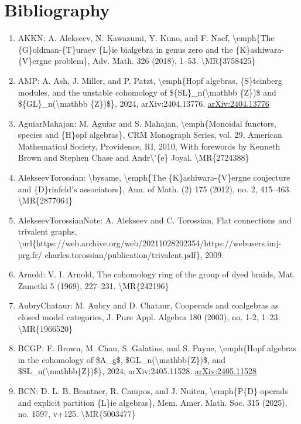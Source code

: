 \documentclass[11pt]{article}
\begin{document}
\section*{Bibliography}
\begin{enumerate}[leftmargin=*]
  \item AKKN: A. Alekseev, N. Kawazumi, Y. Kuno, and F. Naef, \textbackslash{}emph\{The \{G\}oldman-\{T\}uraev \{L\}ie bialgebra in genus zero and the \{K\}ashiwara-\{V\}ergne problem\}, Adv. Math. 326 (2018), 1--53. \textbackslash{}MR\{3758425\}
  \item AMP: A. Ash, J. Miller, and P. Patzt, \textbackslash{}emph\{Hopf algebras, \{S\}teinberg modules, and the unstable cohomology of \$\{SL\}\_n(\textbackslash{}mathbb \{Z\})\$ and \$\{GL\}\_n(\textbackslash{}mathbb \{Z\})\$\}, 2024, arXiv:2404.13776. \href{https://arxiv.org/abs/2404.13776}{arXiv:2404.13776}
  \item AguiarMahajan: M. Aguiar and S. Mahajan, \textbackslash{}emph\{Monoidal functors, species and \{H\}opf algebras\}, CRM Monograph Series, vol. 29, American Mathematical Society, Providence, RI, 2010, With forewords by Kenneth Brown and Stephen Chase and Andr\textbackslash{}'\{e\} Joyal. \textbackslash{}MR\{2724388\}
  \item AlekseevTorossian: \textbackslash{}bysame, \textbackslash{}emph\{The \{K\}ashiwara-\{V\}ergne conjecture and \{D\}rinfeld's associators\}, Ann. of Math. (2) 175 (2012), no. 2, 415--463. \textbackslash{}MR\{2877064\}
  \item AlekseevTorossianNote: A. Alekseev and C. Torossian, Flat connections and trivalent graphs, \textbackslash{}url\{https://web.archive.org/web/20211028202354/https://webusers.imj-prg.fr/ charles.torossian/publication/trivalent.pdf\}, 2009.
  \item Arnold: V. I. Arnold, The cohomology ring of the group of dyed braids, Mat. Zametki 5 (1969), 227--231. \textbackslash{}MR\{242196\}
  \item AubryChataur: M. Aubry and D. Chataur, Cooperads and coalgebras as closed model categories, J. Pure Appl. Algebra 180 (2003), no. 1-2, 1--23. \textbackslash{}MR\{1966520\}
  \item BCGP: F. Brown, M. Chan, S. Galatius, and S. Payne, \textbackslash{}emph\{Hopf algebras in the cohomology of \$A\_g\$, \$GL\_n(\textbackslash{}mathbb\{Z\})\$, and \$SL\_n(\textbackslash{}mathbb\{Z\})\$\}, 2024, arXiv:2405.11528. \href{https://arxiv.org/abs/2405.11528}{arXiv:2405.11528}
  \item BCN: D. L. B. Brantner, R. Campos, and J. Nuiten, \textbackslash{}emph\{P\{D\} operads and explicit partition \{L\}ie algebras\}, Mem. Amer. Math. Soc. 315 (2025), no. 1597, v+125. \textbackslash{}MR\{5003477\}

\end{enumerate}
\end{document}
